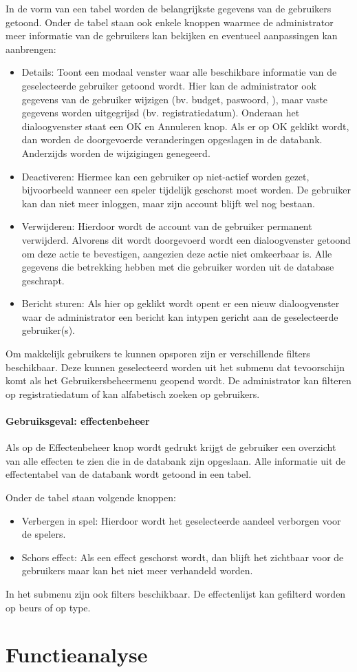 In de vorm van een tabel worden de belangrijkste gegevens van de gebruikers getoond. Onder de tabel staan ook enkele knoppen waarmee de administrator meer informatie van de gebruikers kan bekijken en eventueel aanpassingen kan aanbrengen:
\begin{itemize}
	\item Details: Toont een modaal venster waar alle beschikbare informatie van de geselecteerde gebruiker getoond wordt. Hier kan de administrator ook gegevens van de gebruiker wijzigen (bv. budget, paswoord, 
), maar vaste gegevens worden uitgegrijsd (bv. registratiedatum). Onderaan het dialoogvenster staat een OK en Annuleren knop. Als er op OK geklikt wordt, dan worden de doorgevoerde veranderingen opgeslagen in de databank. Anderzijds worden de wijzigingen genegeerd.
  \item Deactiveren: Hiermee kan een gebruiker op niet-actief worden gezet, bijvoorbeeld wanneer een speler tijdelijk geschorst moet worden. De gebruiker kan dan niet meer inloggen, maar zijn account blijft wel nog bestaan.
   \item Verwijderen: Hierdoor wordt de account van de gebruiker permanent verwijderd. Alvorens dit wordt doorgevoerd wordt een dialoogvenster getoond om deze actie te bevestigen, aangezien deze actie niet omkeerbaar is. Alle gegevens die betrekking hebben met die gebruiker worden uit de database geschrapt.
    \item Bericht sturen: Als hier op geklikt wordt opent er een nieuw dialoogvenster waar de administrator een bericht kan intypen gericht aan de geselecteerde gebruiker(s).
\end{itemize}
Om makkelijk gebruikers te kunnen opsporen zijn er verschillende filters beschikbaar. Deze kunnen geselecteerd worden uit het submenu dat tevoorschijn komt als het Gebruikersbeheermenu geopend wordt. De administrator kan filteren op registratiedatum of kan alfabetisch zoeken op gebruikers.

\subsubsection{Gebruiksgeval: effectenbeheer}
Als op de Effectenbeheer knop wordt gedrukt krijgt de gebruiker een overzicht van alle effecten te zien die in de databank zijn opgeslaan. Alle informatie uit de effectentabel van de databank wordt getoond in een tabel.

Onder de tabel staan volgende knoppen:
\begin{itemize}
	\item Verbergen in spel: Hierdoor wordt het geselecteerde aandeel verborgen voor de spelers.
  \item Schors effect: Als een effect geschorst wordt, dan blijft het zichtbaar voor de gebruikers maar kan het niet meer verhandeld worden.
\end{itemize}

In het submenu zijn ook filters beschikbaar. De effectenlijst kan gefilterd worden op beurs of op type. 

\chapter{Functieanalyse}

